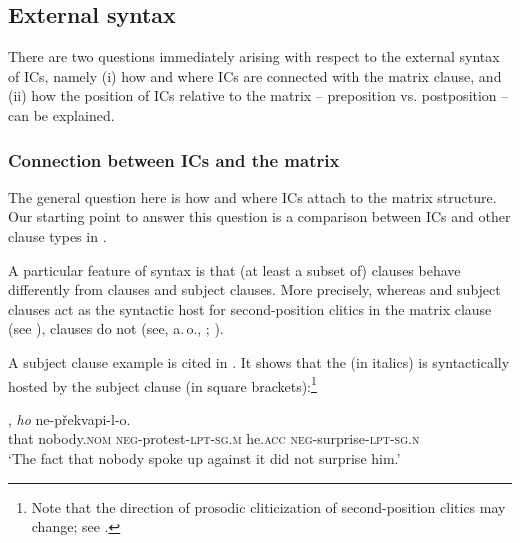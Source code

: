 \documentclass[output=paper,colorlinks,citecolor=brown,newtxmath]{langsci/langscibook}
\begin{document}

\subsection{External syntax}\label{sec:syntax_external}

There are two questions immediately arising with respect to the external syntax of ICs, namely (i) how and where ICs are connected with the matrix clause, and (ii) how the position of ICs relative to the matrix -- preposition vs. postposition -- can be explained.

\subsubsection{Connection between ICs and the matrix}\label{sec:syntax_external_connection}

The general question here is how and where ICs attach to the matrix structure. Our starting point to answer this question is a comparison between ICs and other clause types in .

A particular feature of  syntax is that (at least a subset of)  clauses behave differently from  clauses and subject clauses. More precisely, where\-as  and subject clauses act as the syntactic host for second-position clitics in the matrix clause (see \citealt{Dokulil1956,Fried1994}),  clauses do not (see, a.\,o., \citealt[109]{Dokulil1956}; \citealt[150]{Lenertova2004}).

A subject clause example is cited in . It shows that the  (in italics) is syntactically hosted by the subject clause (in square brackets):\footnote{Note that the direction of prosodic cliticization of  second-position clitics may change; see \citet{Toman1996}.}

\ea\label{ex:Subjektsatz}
, \textit{ho} ne-překvapi-l-o.\\
	{} that nobody.\textsc{nom} \textsc{neg}-protest-\textsc{lpt-sg.m} he.\textsc{acc} \textsc{neg}-surprise-\textsc{lpt-sg.n}\\
\glt `The fact that nobody spoke up against it did not surprise him.' \\ \hfill \citep[;][168]{Fried1994}
\z
\end{document}
